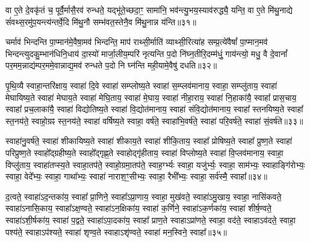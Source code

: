 वा ए॒ते दे॒वकृ॑तं च॒ पूर्वै॒र्मासै॒रव॑ रुन्धते॒ यद्भू॑ते॒च्छदा॒ꣳ॒ सामा॑नि॒ भव॑न्त्यु॒भय॒स्याव॑रुद्ध्यै॒ यन्ति॒ वा ए॒ते मि॑थु॒नाद्ये सं॑वथ्स॒रमु॑प॒यन्त्य॑न्तर्वे॒दि मि॑थु॒नौ सम्भ॑वत॒स्तेनै॒व मि॑थु॒नान्न य॑न्ति॥३१॥

{\anuvakamend[{व्यृ॑द्ध॒मक्षो॑धुका॒स्ताꣳ समां᳚ प्र॒जाः प॑र॒मामे॒व च॑ त्रि॒ꣳ॒शच्च॑॥९॥}]}

चर्माव॑ भिन्दन्ति पा॒प्मान॑मे॒वैषा॒मव॑ भिन्दन्ति॒ माप॑ राथ्सी॒र्माति॑ व्याथ्सी॒रित्या॑ह सम्प्र॒त्ये॑वैषां᳚ पा॒प्मान॒मव॑ भिन्दन्त्युदकु॒म्भान॑धिनि॒धाय॑ दा॒स्यो॑ मार्जा॒लीय॒म्परि॑ नृत्यन्ति प॒दो नि॑घ्न॒तीरि॒दम्म॑धुं॒ गाय॑न्त्यो॒ मधु॒ वै दे॒वानां᳚ पर॒मम॒न्नाद्य॑म्पर॒ममे॒वान्नाद्य॒मव॑ रुन्धते प॒दो नि घ्न॑न्ति मही॒यामे॒वैषु॑ दधति॥३२॥

{\anuvakamend[{चर्मैका॒न्नप॑ञ्चा॒शत्॥10॥}]}

पृ॒थि॒व्यै स्वाहा॒न्तरि॑क्षाय॒ स्वाहा॑ दि॒वे स्वाहा॑ सम्प्लोष्य॒ते स्वाहा॑ स॒म्प्लव॑मानाय॒ स्वाहा॒ सम्प्लु॑ताय॒ स्वाहा॑ मेघायिष्य॒ते स्वाहा॑ मेघाय॒ते स्वाहा॑ मेघि॒ताय॒ स्वाहा॑ मे॒घाय॒ स्वाहा॑ नीहा॒राय॒ स्वाहा॑ नि॒हाका॑यै॒ स्वाहा᳚ प्रास॒चाय॒ स्वाहा᳚ प्रच॒लाका॑यै॒ स्वाहा॑ विद्योतिष्य॒ते स्वाहा॑ वि॒द्योत॑मानाय॒ स्वाहा॑ संवि॒द्योत॑मानाय॒ स्वाहा᳚ स्तनयिष्य॒ते स्वाहा᳚ स्त॒नय॑ते॒ स्वाहो॒ग्रꣴ स्त॒नय॑ते॒ स्वाहा॑ वर्\mbox{}षिष्य॒ते स्वाहा॒ वर्\mbox{}ष॑ते॒ स्वाहा॑भि॒वर्\mbox{}ष॑ते॒ स्वाहा॑ परि॒वर्\mbox{}ष॑ते॒ स्वाहा॑ सं॒वर्\mbox{}ष॑ते॥३३॥

स्वाहा॑नु॒वर्\mbox{}ष॑ते॒ स्वाहा॑ शीकायिष्य॒ते स्वाहा॑ शीकाय॒ते स्वाहा॑ शीकि॒ताय॒ स्वाहा᳚ प्रोषिष्य॒ते स्वाहा᳚ प्रुष्ण॒ते स्वाहा॑ परिप्रुष्ण॒ते स्वाहो᳚द्ग्रहीष्य॒ते स्वाहो᳚द्गृह्ण॒ते स्वाहोद्गृ॑हीताय॒ स्वाहा॑ विप्लोष्य॒ते स्वाहा॑ वि॒प्लव॑मानाय॒ स्वाहा॒ विप्लु॑ताय॒ स्वाहा॑तप्स्य॒ते स्वाहा॒तप॑ते॒ स्वाहो॒ग्रमा॒तप॑ते॒ स्वाह॒र्ग्भ्यः स्वाहा॒ यजु॑र्भ्यः॒ स्वाहा॒ साम॑भ्यः॒ स्वाहाङ्गि॑रोभ्यः॒ स्वाहा॒ वेदे᳚भ्यः॒ स्वाहा॒ गाथा᳚भ्यः॒ स्वाहा॑ नाराश॒ꣳ॒सीभ्यः॒ स्वाहा॒ रैभी᳚भ्यः॒ स्वाहा॒ सर्व॑स्मै॒ स्वाहा᳚॥३४॥

{\anuvakamend[{सं॒ वर्\mbox{}ष॑ते॒ रैभी᳚भ्यः॒ स्वाहा॒ द्वे च॑॥11॥}]}

द॒त्वते॒ स्वाहा॑\-ऽद॒न्तका॑य॒ स्वाहा᳚ प्रा॒णिने॒ स्वाहा᳚\-ऽप्रा॒णाय॒ स्वाहा॒ मुख॑वते॒ स्वाहा॑\-ऽमु॒खाय॒ स्वाहा॒ नासि॑कवते॒ स्वाहा॑\-ऽनासि॒काय॒ स्वाहा᳚\-ऽक्ष॒ण्वते॒ स्वाहा॑\-ऽन॒क्षिका॑य॒ स्वाहा॑ क॒र्णिने॒ स्वाहा॑\-ऽक॒र्णका॑य॒ स्वाहा॑ शीर्\mbox{}ष॒ण्वते॒ स्वाहा॑\-ऽ\-शी॒र्\mbox{}षका॑य॒ स्वाहा॑ प॒द्वते॒ स्वाहा॑\-ऽपा॒दका॑य॒ स्वाहा᳚ प्राण॒ते स्वाहा\-ऽप्रा॑णते॒ स्वाहा॒ वद॑ते॒ स्वाहा\-ऽव॑दते॒ स्वाहा॒ पश्य॑ते॒ स्वाहा\-ऽप॑श्यते॒ स्वाहा॑ शृण्व॒ते स्वाहा\-ऽशृ॑ण्वते॒ स्वाहा॑ मन॒स्विने॒ स्वाहा᳚॥३५॥

